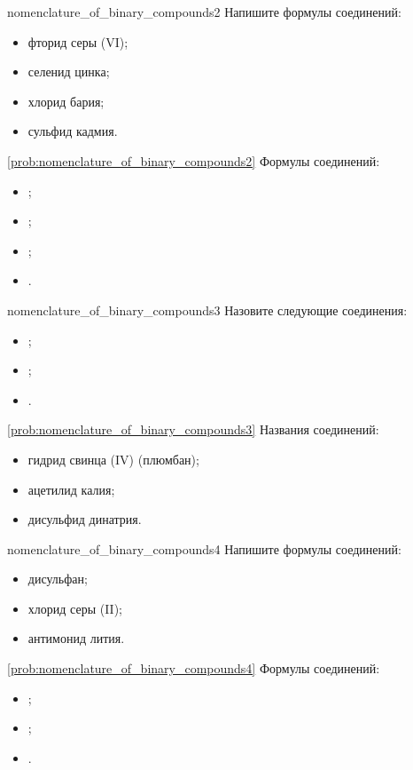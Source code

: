 \begin{problem}{}{nomenclature_of_binary_compounds2}
    Напишите формулы соединений:
    \begin{itemize}
        \item фторид серы (VI);
        \item селенид цинка;
        \item хлорид бария;
        \item сульфид кадмия.
    \end{itemize}
    \begin{sol}{\ref{prob:nomenclature_of_binary_compounds2}}
        Формулы соединений:
        \begin{itemize}
            \item {};
            \item {};
            \item {};
            \item {}.
        \end{itemize}
    \end{sol}
\end{problem}

\begin{problem}{}{nomenclature_of_binary_compounds3}
    Назовите следующие соединения:
    \begin{itemize}
        \item {};
        \item {};
        \item {}.
    \end{itemize}
    \begin{sol}{\ref{prob:nomenclature_of_binary_compounds3}}
        Названия соединений:
        \begin{itemize}
            \item гидрид свинца (IV) (плюмбан);
            \item ацетилид калия;
            \item дисульфид динатрия.
        \end{itemize}
    \end{sol}
\end{problem}

\begin{problem}{}{nomenclature_of_binary_compounds4}
    Напишите формулы соединений:
    \begin{itemize}
        \item дисульфан;
        \item хлорид серы (II);
        \item антимонид лития.
    \end{itemize}
    \begin{sol}{\ref{prob:nomenclature_of_binary_compounds4}}
        Формулы соединений:
        \begin{itemize}
            \item {};
            \item {};
            \item {}.
        \end{itemize}
    \end{sol}
\end{problem}

